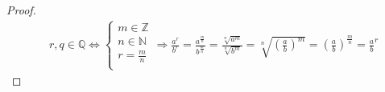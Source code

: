 \begin{proof}
    \begin{align*}
        &r, q \in \mathbb{Q} \iff
        \left\{\begin{array}{l}
            m \in \mathbb{Z} \\
            n \in \mathbb{N} \\
            r = \frac{m}{n} \\
        \end{array}\right. \Rightarrow
        \frac{a^r}{b^r} =  \frac{a^\frac{m}{n}}{b^\frac{m}{n}} = \frac{\sqrt[n]{a^m}}{\sqrt[n]{b^m}} = \sqrt[n]{\left(\frac{a}{b}\right)^m}
        =\left(\frac{a}{b}\right)^\frac{m}{n} = \frac{a}{b}^r
    \end{align*}
\end{proof}